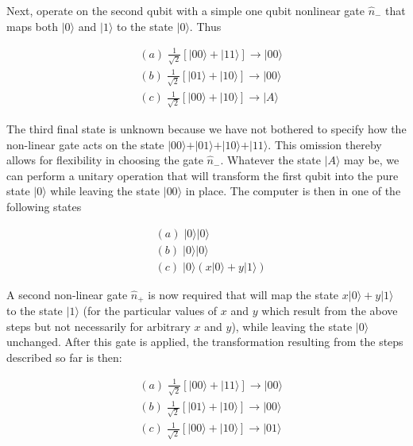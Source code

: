 \documentclass[12pt]{article}
\begin{document}
Next, operate on the second qubit with a simple one qubit nonlinear gate
$\widehat{n}_{-}$ that maps both
$\vert 0 \rangle$
and
$\vert 1 \rangle$
to the state
$\vert 0 \rangle$. Thus%

\begin{align}
&  (a)\;\frac{1}{\sqrt{2}}\left[  |00\rangle+|11\rangle\right]
\longrightarrow|00\rangle\nonumber\\
&  (b)\;\frac{1}{\sqrt{2}}\left[  |01\rangle+|10\rangle\right]
\longrightarrow|00\rangle\\
&  (c)\;\frac{1}{\sqrt{2}}\left[  |00\rangle+|10\rangle\right]
\longrightarrow|A\rangle\nonumber
\end{align}

The third final state is unknown because we have not bothered to specify how
the non-linear gate acts on the state $\vert 00 \rangle + \vert 01 \rangle + \vert 10 \rangle + \vert 11 \rangle$. This omission thereby allows for flexibility in choosing the gate
$\widehat{n}_{-}$. Whatever the state $\vert A \rangle$
may be, we can perform a unitary operation that will transform the first qubit
into the pure state $\vert 0 \rangle$
while leaving the state $\vert 00 \rangle$
in place. The computer is then in one of the following states%

\begin{align}
&  (a)\;|0\rangle|0\rangle\nonumber\\
&  (b)\;|0\rangle|0\rangle\\
&  (c)\;|0\rangle(x|0\rangle+y|1\rangle)\nonumber
\end{align}

A second non-linear gate $\widehat{n}_{+}$ is now required that will map the
state $x \vert 0 \rangle + y \vert 1 \rangle$%
to the state $\vert 1 \rangle$ (for the particular values of $x$ and $y$ which result from the above steps but
not necessarily for arbitrary $x$ and $y$), while leaving the state $\vert 0 \rangle$
unchanged. After this gate is applied, the transformation resulting from the
steps described so far is then:

\begin{align}
&  (a)\;\frac{1}{\sqrt{2}}\left[  |00\rangle+|11\rangle\right]
\longrightarrow|00\rangle\nonumber\\
&  (b)\;\frac{1}{\sqrt{2}}\left[  |01\rangle+|10\rangle\right]
\longrightarrow|00\rangle\\
&  (c)\;\frac{1}{\sqrt{2}}\left[  |00\rangle+|10\rangle\right]
\longrightarrow|01\rangle\nonumber
\end{align}
\end{document}
